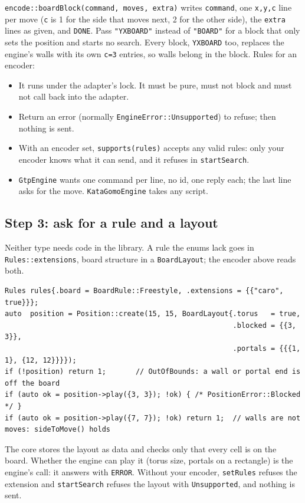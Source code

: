 \documentclass[11pt,a4paper]{article}
\newcommand{\code}[1]{\texttt{#1}}
\begin{document}
\noindent \code{encode::boardBlock(command, moves, extra)} writes \code{command}, one
\code{x,y,c} line per move (\code{c} is 1 for the side that moves next, 2 for the other side), the
\code{extra} lines as given, and \code{DONE}. Pass \code{"YXBOARD"} instead of \code{"BOARD"} for
a block that only sets the position and starts no search. Every block, \code{YXBOARD} too, replaces
the engine's walls with its own \code{c=3} entries, so walls belong in the block. Rules for an encoder:

\begin{itemize}
  \item It runs under the adapter's lock. It must be pure, must not block and must not call back
        into the adapter.
  \item Return an error (normally \code{EngineError::Unsupported}) to refuse; then nothing is
        sent.
  \item With an encoder set, \code{supports(rules)} accepts any valid rules: only your encoder
        knows what it can send, and it refuses in \code{startSearch}.
  \item \code{GtpEngine} wants one command per line, no id, one reply each; the last line asks for
        the move. \code{KataGomoEngine} takes any script.
\end{itemize}

\subsection{Step 3: ask for a rule and a layout}

Neither type needs code in the library. A rule the enums lack goes in \code{Rules::extensions},
board structure in a \code{BoardLayout}; the encoder above reads both.

\begin{lstlisting}
Rules rules{.board = BoardRule::Freestyle, .extensions = {{"caro", true}}};
auto  position = Position::create(15, 15, BoardLayout{.torus   = true,
                                                      .blocked = {{3, 3}},
                                                      .portals = {{{1, 1}, {12, 12}}}});
if (!position) return 1;       // OutOfBounds: a wall or portal end is off the board
if (auto ok = position->play({3, 3}); !ok) { /* PositionError::Blocked */ }
if (auto ok = position->play({7, 7}); !ok) return 1;  // walls are not moves: sideToMove() holds
\end{lstlisting}

\noindent The core stores the layout as data and checks only that every cell is on the board.
Whether the engine can play it (torus size, portals on a rectangle) is the engine's call: it
answers with \code{ERROR}. Without your encoder, \code{setRules} refuses the extension and
\code{startSearch} refuses the layout with \code{Unsupported}, and nothing is sent.
\end{document}
